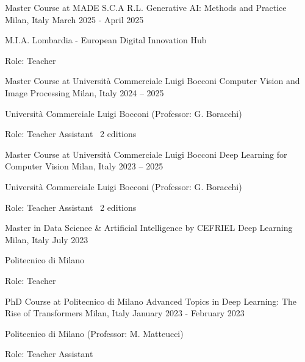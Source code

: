 \begin{cventries}
    \vspace{2mm}
    \cventry
        {Master Course at MADE S.C.A R.L.}
        {Generative AI: Methods and Practice}
        {Milan, Italy}
        {March 2025 - April 2025}
        {
        \begin{cvitems}
            \item {M.I.A. Lombardia - European Digital Innovation Hub}
            \item {Role: Teacher}
        \end{cvitems}
        }

    \vspace{2mm}
    \cventry
        {Master Course at Università Commerciale Luigi Bocconi}
        {Computer Vision and Image Processing}
        {Milan, Italy}
        {2024 -- 2025}
        {
        \begin{cvitems}
            \item {Università Commerciale Luigi Bocconi (Professor: G. Boracchi)}
            \item {Role: Teacher Assistant \textperiodcentered\ 2 editions}
        \end{cvitems}
        }

    \vspace{2mm}
    \cventry
        {Master Course at Università Commerciale Luigi Bocconi}
        {Deep Learning for Computer Vision}
        {Milan, Italy}
        {2023 -- 2025}
        {
        \begin{cvitems}
            \item {Università Commerciale Luigi Bocconi (Professor: G. Boracchi)}
            \item {Role: Teacher Assistant \textperiodcentered\ 2 editions}
        \end{cvitems}
        }

    \vspace{2mm}
    \cventry
        {Master in Data Science \& Artificial Intelligence by CEFRIEL}
        {Deep Learning}
        {Milan, Italy}
        {July 2023}
        {
        \begin{cvitems}
            \item {Politecnico di Milano}
            \item {Role: Teacher}
        \end{cvitems}
        }

    \vspace{2mm}
    \cventry
        {PhD Course at Politecnico di Milano}
        {Advanced Topics in Deep Learning: The Rise of Transformers}
        {Milan, Italy}
        {January 2023 - February 2023}
        {
        \begin{cvitems}
            \item {Politecnico di Milano (Professor: M. Matteucci)}
            \item {Role: Teacher Assistant}
        \end{cvitems}
        }


\end{cventries}
